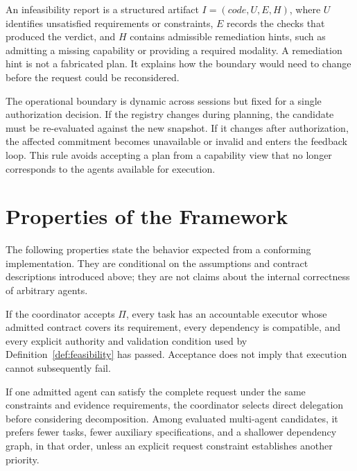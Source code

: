 An infeasibility report is a structured artifact $I=(\mathit{code},U,E,H)$, where $U$ identifies unsatisfied requirements or constraints, $E$ records the checks that produced the verdict, and $H$ contains admissible remediation hints, such as admitting a missing capability or providing a required modality. A remediation hint is not a fabricated plan. It explains how the boundary would need to change before the request could be reconsidered.

The operational boundary is dynamic across sessions but fixed for a single authorization decision. If the registry changes during planning, the candidate must be re-evaluated against the new snapshot. If it changes after authorization, the affected commitment becomes unavailable or invalid and enters the feedback loop. This rule avoids accepting a plan from a capability view that no longer corresponds to the agents available for execution.

\section{Properties of the Framework}

The following properties state the behavior expected from a conforming implementation. They are conditional on the assumptions and contract descriptions introduced above; they are not claims about the internal correctness of arbitrary agents.

\begin{property}
\label{prop:justified-acceptance}
If the coordinator accepts $\Pi$, every task has an accountable executor whose admitted contract covers its requirement, every dependency is compatible, and every explicit authority and validation condition used by Definition~\ref{def:feasibility} has passed. Acceptance does not imply that execution cannot subsequently fail.
\end{property}

\begin{property}
\label{prop:simplicity}
If one admitted agent can satisfy the complete request under the same constraints and evidence requirements, the coordinator selects direct delegation before considering decomposition. Among evaluated multi-agent candidates, it prefers fewer tasks, fewer auxiliary specifications, and a shallower dependency graph, in that order, unless an explicit request constraint establishes another priority.
\end{property}

